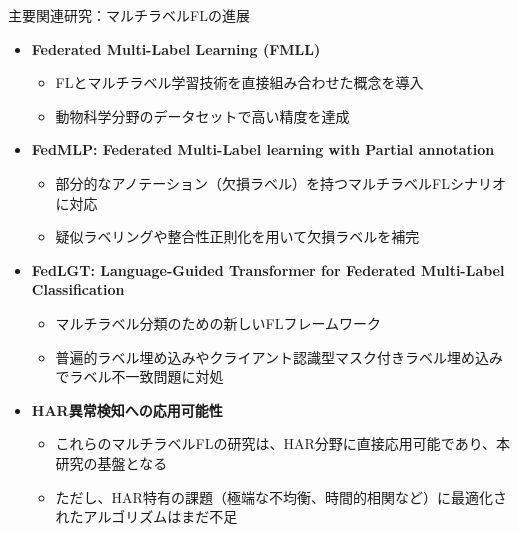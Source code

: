 \documentclass[unicode,12pt,aspectratio=169,dvipdfmx]{beamer}
\begin{document}
\begin{frame}{主要関連研究：マルチラベルFLの進展}
\begin{itemize}
    \item \textbf{Federated Multi-Label Learning (FMLL)}
    \begin{itemize}
        \item FLとマルチラベル学習技術を直接組み合わせた概念を導入
        \item 動物科学分野のデータセットで高い精度を達成
    \end{itemize}
    \item \textbf{FedMLP: Federated Multi-Label learning with Partial annotation}
    \begin{itemize}
        \item 部分的なアノテーション（欠損ラベル）を持つマルチラベルFLシナリオに対応
        \item 疑似ラベリングや整合性正則化を用いて欠損ラベルを補完
    \end{itemize}
    \item \textbf{FedLGT: Language-Guided Transformer for Federated Multi-Label Classification}
    \begin{itemize}
        \item マルチラベル分類のための新しいFLフレームワーク
        \item 普遍的ラベル埋め込みやクライアント認識型マスク付きラベル埋め込みでラベル不一致問題に対処
    \end{itemize}
    \item \textbf{HAR異常検知への応用可能性}
    \begin{itemize}
        \item これらのマルチラベルFLの研究は、HAR分野に直接応用可能であり、本研究の基盤となる
        \item ただし、HAR特有の課題（極端な不均衡、時間的相関など）に最適化されたアルゴリズムはまだ不足
    \end{itemize}
\end{itemize}
\end{frame}

\end{document}
